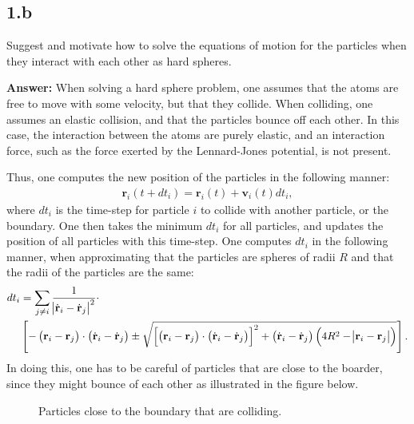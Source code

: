 \documentclass[a4paper]{article}
\newcommand{\newparagraph}{\vspace{.5cm}\noindent}
\begin{document}
\subsection*{1.b}
Suggest and motivate how to solve the equations of motion for the particles when they interact with each other as {\color{blue} hard spheres}.

\newparagraph
\textbf{Answer:} When solving a hard sphere problem, one assumes that the atoms are free to move with some velocity, but that they collide. When colliding, one assumes an elastic collision, and that the particles bounce off each other.
In this case, the interaction between the atoms are purely elastic, and an interaction force, such as the force exerted by the Lennard-Jones potential, is not present.

\newparagraph
Thus, one computes the new position of the particles in the following manner:
\begin{align*}
    \mathbf{r}_i(t + dt_i) = \mathbf{r}_i(t) + \mathbf{v}_i(t)dt_i,
\end{align*}where $dt_i$ is the time-step for particle $i$ to collide with another particle, or the boundary. One then takes the minimum $dt_i$ for all particles, and updates the position of all particles with this time-step.
One computes $dt_i$ in the following manner, when approximating that the particles are spheres of radii $R$ and that the radii of the particles are the same:
\begin{align*}
    dt_i &= \sum_{j \neq i}\frac{1}{\abs{\dot{\mathbf{r}}_i - \dot{\mathbf{r}}_j}^2}\cdot\\
    &\left[-\left(\mathbf{r}_i - \mathbf{r}_j\right)\cdot\left(\dot{\mathbf{r}}_i - \dot{\mathbf{r}}_j\right)\pm\sqrt{\left[\left(\mathbf{r}_i - \mathbf{r}_j\right)\cdot\left(\dot{\mathbf{r}}_i - \dot{\mathbf{r}}_j\right)\right]^2 + \left(\dot{\mathbf{r}}_i - \dot{\mathbf{r}}_j\right)\left(4R^2 - \abs{\mathbf{r}_i - \mathbf{r}_j}\right)}\right].
\end{align*}In doing this, one has to be careful of particles that are close to the boarder, since they might bounce of each other as illustrated in the figure below.
\begin{figure}[H]
    \centering
    \caption{Particles close to the boundary that are colliding.}
\end{figure}
\end{document}
